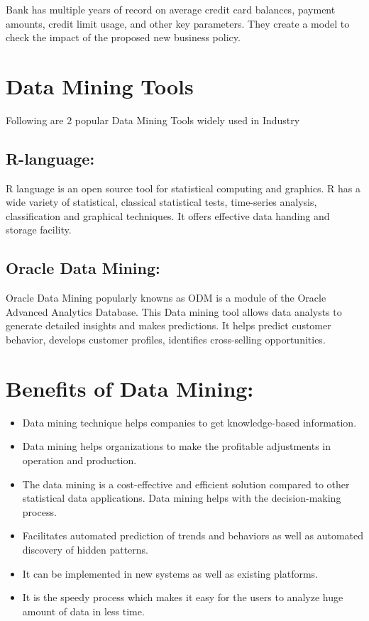 \documentclass[a4paper,10pt]{article}
\begin{document}
Bank has multiple years of record on average credit card balances, payment amounts, credit limit usage, and other key parameters. They create a model to check the impact of the proposed new business policy.

\section{Data Mining Tools}
Following are 2 popular Data Mining Tools widely used in Industry
\subsection*{R-language:}
R language is an open source tool for statistical computing and graphics. R has a wide variety of statistical, classical statistical tests, time-series analysis, classification and graphical techniques. It offers effective data handing and storage facility.
\subsection*{Oracle Data Mining:}
Oracle Data Mining popularly knowns as ODM is a module of the Oracle Advanced Analytics Database. This Data mining tool allows data analysts to generate detailed insights and makes predictions. It helps predict customer behavior, develops customer profiles, identifies cross-selling opportunities.

\section{Benefits of Data Mining:}
\begin{itemize}
	\item Data mining technique helps companies to get knowledge-based information.
	\item Data mining helps organizations to make the profitable adjustments in operation and production.
	\item The data mining is a cost-effective and efficient solution compared to other statistical data applications.
Data mining helps with the decision-making process.
	\item Facilitates automated prediction of trends and behaviors as well as automated discovery of hidden patterns.
	\item It can be implemented in new systems as well as existing platforms.
	\item It is the speedy process which makes it easy for the users to analyze huge amount of data in less time.
\end{itemize}
\end{document}
